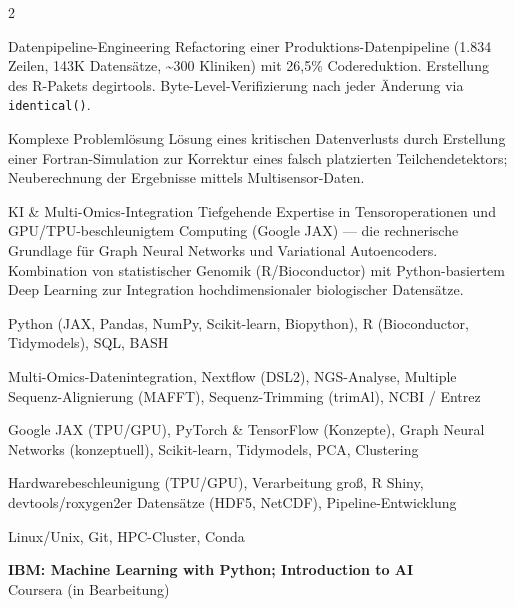 \documentclass{thejus_cv}
\begin{document}
\begin{paracol}{2}
\switchcolumn



\cvstrength{\faStar}
           {Datenpipeline-Engineering}
           {Refactoring einer Produktions-Datenpipeline (1.834 Zeilen, 143K Datens\"atze, \textasciitilde300 Kliniken) mit 26,5\% Codereduktion. Erstellung des R-Pakets degirtools. Byte-Level-Verifizierung nach jeder \"Anderung via \texttt{identical()}.}

\cvstrength{\faLightbulb}
           {Komplexe Probleml\"osung}
           {L\"osung eines kritischen Datenverlusts durch Erstellung einer Fortran-Simulation zur Korrektur eines falsch platzierten Teilchendetektors; Neuberechnung der Ergebnisse mittels Multisensor-Daten.}

\cvstrength{\faAward}
           {KI \& Multi-Omics-Integration}
           {Tiefgehende Expertise in Tensoroperationen und GPU/TPU-beschleunigtem Computing (Google JAX) --- die rechnerische Grundlage f\"ur Graph Neural Networks und Variational Autoencoders. Kombination von statistischer Genomik (R/Bioconductor) mit Python-basiertem Deep Learning zur Integration hochdimensionaler biologischer Datens\"atze.}


         {Python (JAX, Pandas, NumPy, Scikit-learn, Biopython), R (Bioconductor, Tidymodels), SQL, BASH}

         {Multi-Omics-Datenintegration, Nextflow (DSL2), NGS-Analyse, Multiple Sequenz-Alignierung (MAFFT), Sequenz-Trimming (trimAl), NCBI / Entrez}

         {Google JAX (TPU/GPU), PyTorch \& TensorFlow (Konzepte), Graph Neural Networks (konzeptuell), Scikit-learn, Tidymodels, PCA, Clustering}

         {Hardwarebeschleunigung (TPU/GPU), Verarbeitung gro{\ss, R Shiny, devtools/roxygen2}er Datens\"atze (HDF5, NetCDF), Pipeline-Entwicklung}

         {Linux/Unix, Git, HPC-Cluster, Conda}



\textbf{IBM: Machine Learning with Python; Introduction to AI}\\
{\small Coursera (in Bearbeitung)}\\[0.3cm]


\end{paracol}
\end{document}
